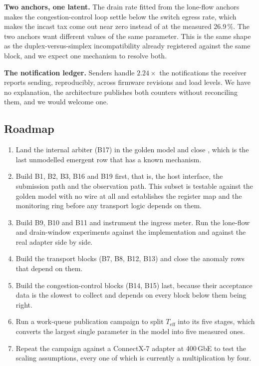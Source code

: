 \textbf{Two anchors, one latent.} The drain rate fitted from the lone-flow
anchors makes the congestion-control loop settle below the switch egress rate,
which makes the incast tax come out near zero instead of at the measured
26.9\,\%. The two anchors want different values of the same parameter. This is
the same shape as the duplex-versus-simplex incompatibility already registered
against the same block, and we expect one mechanism to resolve both.

\textbf{The notification ledger.} Senders handle $2.24\times$ the notifications
the receiver reports sending, reproducibly, across firmware revisions and load
levels. We have no explanation, the architecture publishes both counters
without reconciling them, and we would welcome one.

\subsection{Roadmap}

\begin{enumerate}
  \item Land the internal arbiter (B17) in the golden model and close
    , which is the last unmodelled emergent row that has a known
    mechanism.
  \item Build B1, B2, B3, B16 and B19 first, that is, the host interface, the
    submission path and the observation path. This subset is testable against
    the golden model with no wire at all and establishes the register map and
    the monitoring ring before any transport logic depends on them.
  \item Build B9, B10 and B11 and instrument the ingress meter. Run the
    lone-flow and drain-window experiments against the implementation and
    against the real adapter side by side.
  \item Build the transport blocks (B7, B8, B12, B13) and close the anomaly
    rows that depend on them.
  \item Build the congestion-control blocks (B14, B15) last, because their
    acceptance data is the slowest to collect and depends on every block below
    them being right.
  \item Run a work-queue publication campaign to split $T_{\text{eff}}$ into
    its five stages, which converts the largest single \evcal{} parameter in
    the model into five measured ones.
  \item Repeat the campaign against a ConnectX-7 adapter at 400\,GbE to test
    the \evdecl{} scaling assumptions, every one of which is currently a
    multiplication by four.
\end{enumerate}

